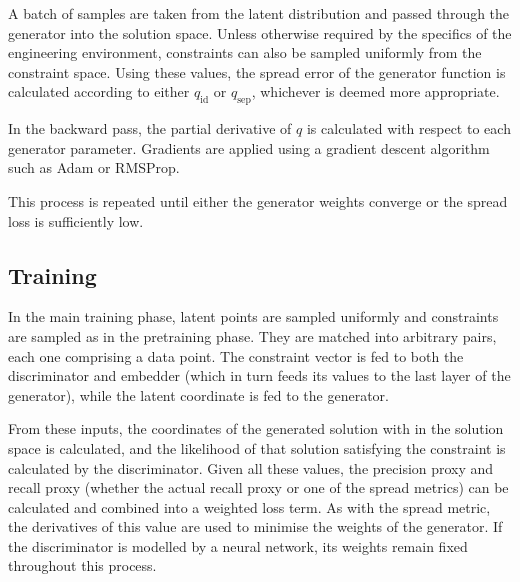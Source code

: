 \documentclass[../../main.tex]{subfiles}
\begin{document}
A batch of samples are taken from the latent distribution and passed through the generator into the solution space.
Unless otherwise required by the specifics of the engineering environment, constraints can also be sampled uniformly from the constraint space.
Using these values, the spread error of the generator function is calculated according to either $q_\text{id}$ or $q_\text{sep}$, whichever is deemed more appropriate.

In the backward pass, the partial derivative of $q$ is calculated with respect to each generator parameter.
Gradients are applied using a gradient descent algorithm such as Adam or RMSProp.

This process is repeated until either the generator weights converge or the spread loss is sufficiently low.

\subsection{Training} \label{subsection:training}

In the main training phase, latent points are sampled uniformly and constraints are sampled as in the pretraining phase.
They are matched into arbitrary pairs, each one comprising a data point.
The constraint vector is fed to both the discriminator and embedder (which in turn feeds its values to the last layer of the generator), while the latent coordinate is fed to the generator.

From these inputs, the coordinates of the generated solution with in the solution space is calculated, and the likelihood of that solution satisfying the constraint is calculated by the discriminator.
Given all these values, the precision proxy and recall proxy (whether the actual recall proxy or one of the spread metrics) can be calculated and combined into a weighted loss term.
As with the spread metric, the derivatives of this value are used to minimise the weights of the generator.
If the discriminator is modelled by a neural network, its weights remain fixed throughout this process.
\end{document}
